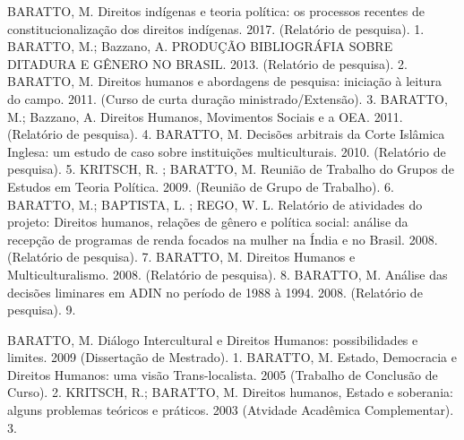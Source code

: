 \begin{cvhonors}
  \cvhonor
    {BARATTO, M.}
    {Direitos indígenas e teoria política: os processos recentes de constitucionalização dos direitos indígenas. 2017. (Relatório de pesquisa).}
    {}
    {1. }
  \cvhonor
    {BARATTO, M.; Bazzano, A.}
    {PRODUÇÃO BIBLIOGRÁFIA SOBRE DITADURA E GÊNERO NO BRASIL. 2013. (Relatório de pesquisa).}
    {}
    {2. }
  \cvhonor
    {BARATTO, M.}
    {Direitos humanos e abordagens de pesquisa: iniciação à leitura do campo. 2011. (Curso de curta duração ministrado/Extensão).}
    {}
    {3. }
  \cvhonor
    {BARATTO, M.; Bazzano, A.}
    {Direitos Humanos, Movimentos Sociais e a OEA. 2011. (Relatório de pesquisa).}
    {}
    {4. }
  \cvhonor
    {BARATTO, M.}
    {Decisões arbitrais da Corte Islâmica Inglesa: um estudo de caso sobre instituições multiculturais. 2010. (Relatório de pesquisa).}
    {}
    {5. }
  \cvhonor
    {KRITSCH, R. ; BARATTO, M.}
    {Reunião de Trabalho do Grupos de Estudos em Teoria Política. 2009. (Reunião de Grupo de Trabalho).}
    {}
    {6. }
  \cvhonor
    {BARATTO, M.; BAPTISTA, L. ; REGO, W. L.}
    {Relatório de atividades do projeto: Direitos humanos, relações de gênero e política social: análise da recepção de programas de renda focados na mulher na Índia e no Brasil. 2008. (Relatório de pesquisa).}
    {}
    {7. }
  \cvhonor
    {BARATTO, M.}
    {Direitos Humanos e Multiculturalismo. 2008. (Relatório de pesquisa).}
    {}
    {8. }
  \cvhonor
    {BARATTO, M.}
    {Análise das decisões liminares em ADIN no período de 1988 à 1994. 2008. (Relatório de pesquisa).}
    {}
    {9. }
\end{cvhonors}


\begin{cvhonors}
  \cvhonor
    {BARATTO, M.}
    {Diálogo Intercultural e Direitos Humanos: possibilidades e limites. 2009 (Dissertação de Mestrado).}
    {}
    {1. }
  \cvhonor
    {BARATTO, M.}
    {Estado, Democracia e Direitos Humanos: uma visão Trans-localista. 2005 (Trabalho de Conclusão de Curso).}
    {}
    {2. }
  \cvhonor
    {KRITSCH, R.; BARATTO, M.}
    {Direitos humanos, Estado e soberania: alguns problemas teóricos e práticos. 2003
    (Atvidade Acadêmica Complementar).}
    {}
    {3. }
\end{cvhonors}
